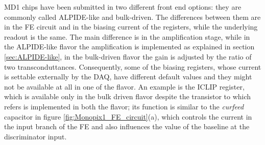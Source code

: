         MD1 chips have been submitted in two different front end options: they are commonly called ALPIDE-like and bulk-driven.  
        The differences between them are in the FE circuit and in the biasing current of the registers, while the underlying readout is the same.
        The main difference is in the amplification stage, while in the ALPIDE-like flavor the amplification is implemented as explained in section \ref{sec:ALPIDE-like}, in the bulk-driven flavor the gain is adjusted by the ratio of two transconduttances. Consequently, some of the biasing registers, whose current is settable externally by the DAQ, have different default values and they might not be available at all in one of the flavor.
        An example is the ICLIP register, which is available only in the bulk driven flavor despite the transistor to which refers is implemented in both the flavor; its function is similar to the \emph{curfeed} capacitor in figure \ref{fig:Monopix1_FE_circuit}(a), which controls the current in the input branch of the FE and also influences the value of the baseline at the discriminator input. 

